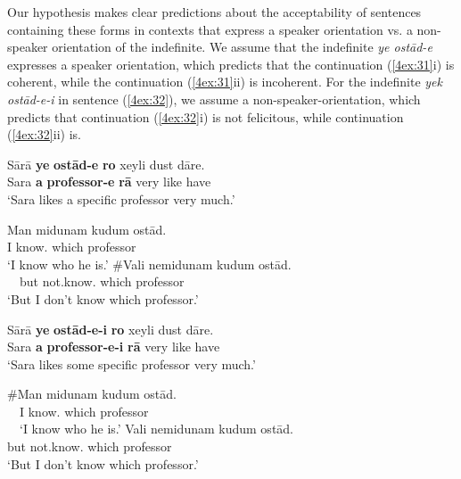 \documentclass[output=paper]{langsci/langscibook}
\begin{document}
\largerpage
Our hypothesis makes clear predictions about the acceptability of sentences containing these forms in contexts that express a speaker orientation vs. a non-speaker orientation of the indefinite. We assume that the indefinite {\emph{ye ostād-e}} expresses a speaker orientation, which predicts that the continuation (\ref{4ex:31}i) is coherent, while the continuation (\ref{4ex:31}ii) is incoherent. For the indefinite {\emph{yek ostād-e-i}} in sentence (\ref{4ex:32}), we assume a non-speaker-orientation, which predicts that continuation (\ref{4ex:32}i) is not felicitous, while continuation (\ref{4ex:32}ii) is.

\begin{exe}
\ex\label{4ex:31}
\gll	Sārā  {\bf{ye}} {\bf{ostād-e}} 	{\bf{ro}}  	xeyli dust  dāre. \\
         Sara   {\bf{a}}   {\bf{professor-e}} {\bf{rā}} 	very  like   have	 \\
\glt	`Sara likes a specific professor very much.'
	\begin{xlista}
	\gll	Man midunam   kudum 	ostād. \\
		I       know.{} which   	professor \\
	\glt	`I know who he is.'
	\gll	\#Vali nemidunam     kudum 	ostād. \\
		\ \ but  not.know.{} 	which  	professor \\
	\glt	`But I don't know which professor.'
	\end{xlista}
\ex\label{4ex:32}
\gll	Sārā  {\bf{ye}} {\bf{ostād-e-i}}      {\bf{ro}}   	xeyli dust dāre.  \\
         Sara   {\bf{a}}  {\bf{professor-e-i}} {\bf{rā}} 		very  like  have \\
\glt	`Sara likes some specific professor very much.'
	\begin{xlista}
	\exi{(i)}
	\gll	\#Man midunam   kudum ostād. \\
		\ \ I       know.{} 	which   professor \\
	\glt	\ \ `I know who he is.'
	\exi{(ii)}
	\gll	Vali nemidunam     kudum ostād. \\
		but not.know.{}  which  professor \\
	\glt	`But I don't know which professor.'
	\end{xlista}
\end{exe}
\end{document}
